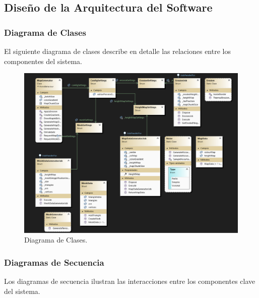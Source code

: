 \subsection{Diseño de la Arquitectura del Software}

\subsubsection{Diagrama de Clases}

 El siguiente diagrama de clases describe en detalle las relaciones entre los componentes del sistema.

\begin{figure}[H]
    \centering
    \includegraphics[width=1\textwidth]{img/diagrama de clases.png}
    \caption{Diagrama de Clases.}
\end{figure}
\newpage

\subsubsection{Diagramas de Secuencia}
Los diagramas de secuencia ilustran las interacciones entre los componentes clave del sistema.

